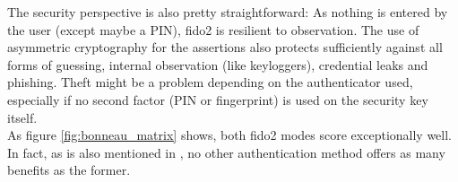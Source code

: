 \noindent The security perspective is also pretty straightforward: As nothing is entered by the user (except maybe a PIN), \ac{fido2} is resilient to observation. The use of asymmetric cryptography for the assertions also protects sufficiently against all forms of guessing, internal observation (like keyloggers), credential leaks and phishing. Theft might be a problem depending on the authenticator used, especially if no second factor (PIN or fingerprint) is used on the security key itself.\\

\noindent As figure \ref{fig:bonneau_matrix} shows, both \ac{fido2} modes score exceptionally well. In fact, as is also mentioned in \cite{lyastani2020}, no other authentication method offers as many benefits as the former.